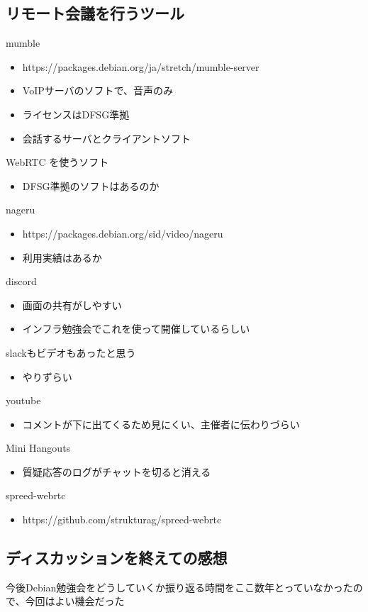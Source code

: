 \documentclass[mingoth,a4paper]{jsarticle}
\begin{document}
\subsection{リモート会議を行うツール}

mumble
\begin{itemize}
\item https://packages.debian.org/ja/stretch/mumble-server
\item VoIPサーバのソフトで、音声のみ
\item ライセンスはDFSG準拠
\item 会話するサーバとクライアントソフト
\end{itemize}

WebRTC を使うソフト
\begin{itemize}
\item DFSG準拠のソフトはあるのか
\end{itemize}

nageru
\begin{itemize}
\item https://packages.debian.org/sid/video/nageru
\item 利用実績はあるか
\end{itemize}

discord
\begin{itemize}
\item 画面の共有がしやすい
\item インフラ勉強会でこれを使って開催しているらしい
\end{itemize}

slackもビデオもあったと思う
\begin{itemize}
\item やりずらい
\end{itemize}

youtube
\begin{itemize}
\item コメントが下に出てくるため見にくい、主催者に伝わりづらい
\end{itemize}

Mini Hangouts
\begin{itemize}
\item 質疑応答のログがチャットを切ると消える
\end{itemize}

spreed-webrtc
\begin{itemize}
\item https://github.com/strukturag/spreed-webrtc
\end{itemize}

\subsection{ディスカッションを終えての感想}
今後Debian勉強会をどうしていくか振り返る時間をここ数年とっていなかったので、今回はよい機会だった
\end{document}
